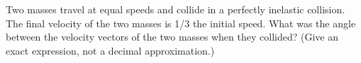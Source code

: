 Two masses travel at equal speeds and collide in a perfectly
inelastic collision. The final velocity of the two masses is 1/3
the initial speed. What was the angle between
the velocity vectors of the two masses when they collided? (Give
an exact expression, not a decimal approximation.)\answercheck
